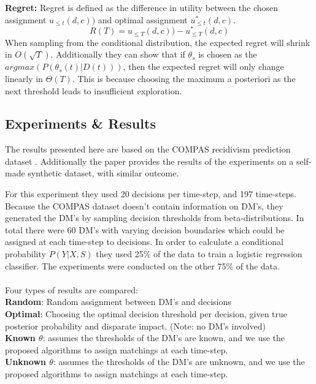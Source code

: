 \documentclass[11pt,a4paper,final]{article}
\begin{document}
\textbf{Regret:}
Regret is defined as the difference in utility between the chosen assignment $u_{\le t}(d,c))$ and optimal assignment $u_{\le t }^*(d,c)$.
$$R(T)=u_{\le T}(d,c))-u_{\le T }^*(d,c)$$
When sampling from the conditional distribution, the expected regret will shrink in $O(\sqrt{T})$.
Additionally they can show that if $\theta_s$ is chosen as the $argmax(P(\theta_s(t)|D(t)))$, then the expected regret will only change linearly in $\Theta(T)$. This is because choosing the maximum a posteriori as the next threshold leads to insufficient exploration.  

\subsection{Experiments \& Results}

The results presented here are based on the COMPAS recidivism prediction dataset \citep{larson2016we}. Additionally the paper provides the results of the experiments on a self-made synthetic dataset, with similar outcome.

For this experiment they used 20 decisions per time-step, and 197 time-steps. Because the COMPAS dataset doesn't contain information on DM's, they generated the DM's by sampling decision thresholds from beta-distributions. In total there were 60 DM's with varying decision boundaries which could be assigned at each time-step to decisions. In order to calculate a conditional probability $P(Y|X,S)$ they used 25\% of the data to train a logistic regression classifier. The experiments were conducted on the other 75\% of the data.
\\\\
Four types of results are compared:\\
\textbf{Random}: Random assignment between DM's and decisions\\
\textbf{Optimal}: Choosing the optimal decision threshold per decision, given true posterior probability and disparate impact. (Note: no DM's involved)\\
\textbf{Known $\theta$}: assumes the thresholds of the DM's are known, and we use the proposed algorithms to assign matchings at each time-step.\\
\textbf{Unknown $\theta$}: assumes the thresholds of the DM's are unknown, and we use the proposed algorithms to assign matchings at each time-step.\\
\end{document}
